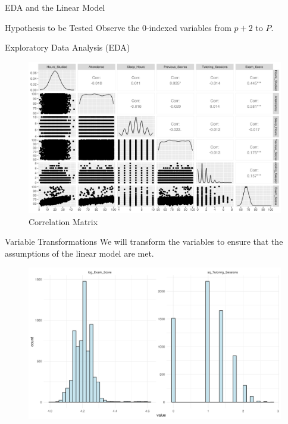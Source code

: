 \documentclass[
  ignorenonframetext,
]{beamer}
\begin{document}
\begin{frame}[fragile]{EDA and the Linear Model}
\begin{block}{Hypothesis to be Tested}
Observe the 0-indexed variables from \(p+2\) to \(P\).
\end{block}

\begin{block}{Exploratory Data Analysis (EDA)}
\label{exploratory-data-analysis-eda}
\begin{figure}[H]

{\centering \includegraphics{correlation_matrix.png}

}

\caption{Correlation Matrix}

\end{figure}%
\end{block}

\begin{block}{Variable Transformations}
\label{variable-transformations}
We will transform the variables to ensure that the assumptions of the
linear model are met.

\begin{figure}[H]

{\centering \includegraphics{histograms.png}

}
\end{figure}
\end{block}
\end{frame}
\end{document}
